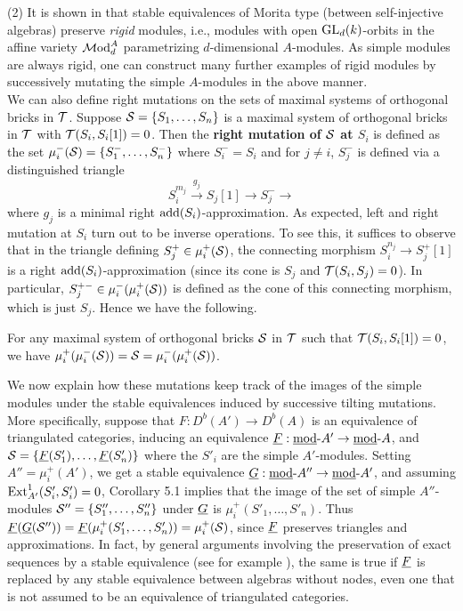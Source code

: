 \documentclass{amsart}
\begin{document}
(2) It is shown in \cite{CX1} that stable equivalences of Morita type (between self-injective algebras) preserve {\it rigid} modules, i.e., modules with open $\mathrm{GL}_d(k)$-orbits in the affine variety $\mathcal{M}\mbox{od}^A_d$ parametrizing $d$-dimensional $A$-modules.  As simple modules are always rigid, one can construct many further examples of rigid modules by successively mutating the simple $A$-modules in the above manner.\\

We can also define right mutations on the sets of maximal systems of orthogonal bricks in $\mathcal{T}$.  Suppose $\mathcal{S} = \{S_1, \ldots, S_n\}$ is a maximal system of orthogonal bricks in $\mathcal{T}$ with $\mathcal{T}(S_i, S_i[1])=0$.  Then the {\bf right mutation of $\mathcal{S}$ at $S_i$} is defined as the set $\mu^-_i(\mathcal{S}) = \{S^-_1, \ldots, S^-_n\}$ where $S^-_i = S_i$ and for $j \neq i$, $S^-_j$ is defined via a distinguished triangle $$S_i^{m_j}  \stackrel{g_j}{\rightarrow} S_j[1] \rightarrow S^-_j \rightarrow$$ where $g_j$ is a minimal right $\mathrm{add}(S_i)$-approximation.  As expected, left and right mutation at $S_i$ turn out to be inverse operations.  To see this, it suffices to observe that in the triangle defining $S^+_j \in \mu^+_i(\mathcal{S})$, the connecting morphism $S_i^{n_j} \rightarrow S^+_j[1]$ is a right $\mathrm{add}(S_i)$-approximation (since its cone is $S_j$ and $\mathcal{T}(S_i,S_j)=0$).  In particular, $S^{+-}_j \in \mu^-_i(\mu^+_i(\mathcal{S}))$ is defined as the cone of this connecting morphism, which is just $S_j$.  Hence we have the following.

\begin{propos} For any maximal system of orthogonal bricks $\mathcal{S}$ in $\mathcal{T}$ such that $\mathcal{T}(S_i,S_i[1])=0$, we have $\mu^+_i(\mu^-_i(\mathcal{S})) = \mathcal{S} = \mu^-_i(\mu^+_i(\mathcal{S}))$.
\end{propos}

We now explain how these mutations keep track of the images of the simple modules under the stable equivalences induced by successive tilting mutations.  More specifically, suppose that $F : D^b(A') \rightarrow D^b(A)$ is an equivalence of triangulated categories, inducing an equivalence $\underline{F}: \mbox{\underline{mod}-} A' \rightarrow \mbox{\underline{mod}-} A$, and $\mathcal{S} = \{\underline{F}(S'_1), \ldots, \underline{F}(S'_n)\}$ where the $S'_i$ are the simple $A'$-modules.  Setting  $A'' = \mu^+_i(A')$, we get a stable equivalence $\underline{G} : \mbox{\underline{mod}-} A'' \rightarrow \mbox{\underline{mod}-} A'$, and assuming $\mathrm{Ext}^1_{A'}(S'_i,S'_i)=0$,  Corollary 5.1 implies that the image of the set of simple $A''$-modules $\mathcal{S}'' = \{S''_1, \ldots, S''_n\}$ under $\underline{G}$ is $\mu^+_i(S'_1, \ldots, S'_n)$.  Thus $\underline{F}(\underline{G}(\mathcal{S}'')) = \underline{F}(\mu^+_i(S'_1, \ldots, S'_n)) = \mu^+_i(\mathcal{S})$, since $\underline{F}$ preserves triangles and approximations.  In fact, by general arguments involving the preservation of exact sequences by a stable equivalence (see for example \cite{IPUSE}), the same is true if $\underline{F}$ is replaced by any stable equivalence between algebras without nodes, even one that is not assumed to be an equivalence of triangulated categories.
\end{document}
